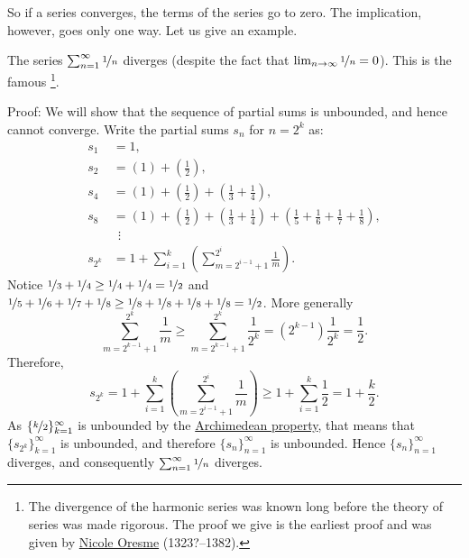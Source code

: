 So if a series converges, the terms of the series go to zero.
The implication, however, goes only one way.
Let us give an example.

\begin{example} \label{example:harmonicseries}
The series $\sum_{n=1}^\infty \nicefrac{1}{n}$ diverges (despite the fact that
$\lim_{n\to\infty} \nicefrac{1}{n} = 0$).
This is the famous \emph{}%
\footnote{The divergence of the harmonic series was known 
long before the theory of series was made rigorous.  The proof we
give is the earliest proof and was given by
\href{https://en.wikipedia.org/wiki/Oresme}{Nicole Oresme}
(1323?--1382).}.

Proof: We will show that the sequence of partial sums is unbounded, and hence
cannot converge.
Write the partial sums $s_n$ for $n = 2^k$ as:
\begin{align*}
 s_1 & = 1 , \\
 s_2 & = \left( 1 \right) + \left( \frac{1}{2} \right) , \\
 s_4 & = \left( 1 \right) + \left( \frac{1}{2} \right) +
        \left( \frac{1}{3} + \frac{1}{4} \right) , \\
 s_8 & = \left( 1 \right) + \left( \frac{1}{2} \right) +
        \left( \frac{1}{3} + \frac{1}{4} \right) +
        \left( \frac{1}{5} + \frac{1}{6} + \frac{1}{7} + \frac{1}{8} \right) , \\
& ~~ \vdots \\
 s_{2^k} & = 
1 + 
\sum_{i=1}^k
\left(
\sum_{m=2^{i-1}+1}^{2^i} \frac{1}{m}
\right) .
\end{align*}
Notice $\nicefrac{1}{3} + \nicefrac{1}{4} \geq \nicefrac{1}{4} + \nicefrac{1}{4} =
\nicefrac{1}{2}$ and
$\nicefrac{1}{5} + \nicefrac{1}{6} + \nicefrac{1}{7} + \nicefrac{1}{8}
\geq \nicefrac{1}{8} + \nicefrac{1}{8} + \nicefrac{1}{8} + \nicefrac{1}{8} =
\nicefrac{1}{2}$.  More generally
\begin{equation*}
\sum_{m=2^{k-1}+1}^{2^k} \frac{1}{m}
\geq
\sum_{m=2^{k-1}+1}^{2^k} \frac{1}{2^k}
=
(2^{k-1}) \frac{1}{2^k} = \frac{1}{2} .
\end{equation*}
Therefore,
\begin{equation*}
s_{2^k} = 
1 + 
\sum_{i=1}^k
\left(
\sum_{m=2^{i-1}+1}^{2^i} \frac{1}{m}
\right) 
\geq
1 + \sum_{i=1}^k \frac{1}{2} = 1 + \frac{k}{2} .
\end{equation*}
As $\{ \nicefrac{k}{2} \}_{k=1}^\infty$ is unbounded by the
\hyperref[thm:arch:i]{Archimedean property}, that means that
$\{ s_{2^k} \}_{k=1}^\infty$ is unbounded,
and therefore $\{ s_n \}_{n=1}^\infty$ is unbounded.
Hence $\{ s_n \}_{n=1}^\infty$ diverges, and consequently $\sum_{n=1}^\infty \nicefrac{1}{n}$ diverges.
\end{example}

